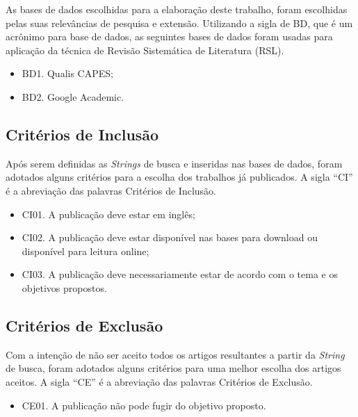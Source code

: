As bases de dados escolhidas para a elaboração deste trabalho, foram escolhidas pelas suas relevâncias de pesquisa e extensão. Utilizando a sigla de BD, que é um acrônimo para base de dados, as seguintes bases de dados foram usadas para aplicação da técnica de Revisão Sistemática de Literatura (RSL).

\begin{itemize}
    \item BD1. Qualis CAPES;
    \item BD2. Google Academic.
\end{itemize} 

\subsection{Critérios de Inclusão}
\label{subsec:inclusao}

Após serem definidas as \textit{Strings} de busca e inseridas nas bases de dados, foram adotados alguns critérios para a escolha dos trabalhos já publicados. A sigla “CI” é a abreviação das palavras Critérios de Inclusão.

\begin{itemize}
    \item CI01. A publicação deve estar em inglês;
    \item CI02. A publicação deve estar disponível nas bases para download ou disponível para leitura online;
    \item CI03. A publicação deve necessariamente estar de acordo com o tema e os objetivos propostos.
\end{itemize}

\subsection{Critérios de Exclusão}
\label{subsec:exclusao}

Com a intenção de não ser aceito todos os artigos resultantes a partir da \textit{String} de busca, foram adotados alguns critérios para uma melhor escolha dos artigos aceitos. A sigla “CE” é a abreviação das palavras Critérios de Exclusão. 

\begin{itemize}
    \item CE01. A publicação não pode fugir do objetivo proposto.
\end{itemize}